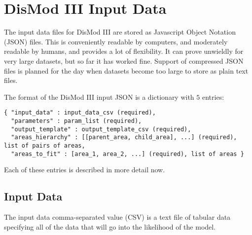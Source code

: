 \section{DisMod III Input Data}

The input data files for DisMod III are stored as Javascript Object
Notation (JSON) files.  This is conveniently readable by computers,
and moderately readable by humans, and provides a lot of flexibility.
It can prove unwieldly for very large datasets, but so far it has
worked fine.  Support of compressed JSON files is planned for the day
when datasets become too large to store as plain text files.

The format of the DisMod III input JSON is a dictionary with $5$ entries:
\begin{verbatim}
{ "input_data" : input_data_csv (required),
  "parameters" : param_list (required),
  "output_template" : output_template_csv (required),
  "areas_hierarchy" : [[parent_area, child_area], ...] (required), list of pairs of areas,
  "areas_to_fit" : [area_1, area_2, ...] (required), list of areas }
\end{verbatim}

Each of these entries is described in more detail now.

\subsection{Input Data}
The input data comma-separated value (CSV) is a text file of tabular
data specifying all of the data that will go into the likelihood of
the model.

